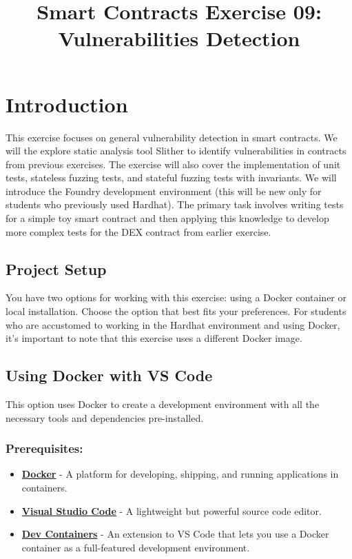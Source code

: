 \documentclass[12pt]{article}
\title{Smart Contracts Exercise 09: \\ Vulnerabilities Detection}
\author{}
\date{}
\begin{document}
\maketitle
\section{Introduction}

This exercise focuses on general vulnerability detection in smart contracts. We
will the explore static analysis tool Slither to identify vulnerabilities in
contracts from previous exercises. The exercise will also cover the
implementation of unit tests, stateless fuzzing tests, and stateful fuzzing
tests with invariants. We will introduce the Foundry development environment
(this will be new only for students who previously used Hardhat). The primary
task involves writing tests for a simple toy smart contract and then applying
this knowledge to develop more complex tests for the DEX contract from earlier
exercise.

\subsection*{Project Setup}

You have two options for working with this exercise: using a Docker container
or local installation. Choose the option that best fits your preferences. For
students who are accustomed to working in the Hardhat environment and using
Docker, it's important to note that this exercise uses a different Docker
image.

\subsection{Using Docker with VS Code}

This option uses Docker to create a development environment with all the
necessary tools and dependencies pre-installed.

\subsubsection*{Prerequisites:}

\begin{itemize}
    \item \textbf{\href{https://www.docker.com/products/docker-desktop}{Docker}} - A platform for developing, shipping, and running applications in containers.
    \item \textbf{\href{https://code.visualstudio.com/}{Visual Studio Code}} - A lightweight but powerful source code editor.
    \item \textbf{\href{https://marketplace.visualstudio.com/items?itemName=ms-vscode-remote.remote-containers}{Dev Containers}} - An extension to VS Code that lets you use a Docker container as a full-featured development environment.
\end{itemize}
\end{document}
